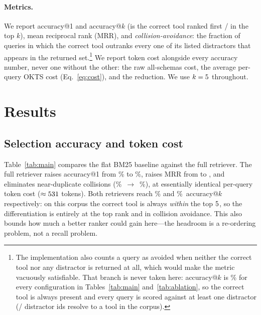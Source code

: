 \documentclass[11pt]{article}
\begin{document}
\paragraph{Metrics.} We report accuracy@1 and accuracy@$k$ (is the correct tool
ranked first / in the top $k$), mean reciprocal rank (MRR), and
\emph{collision-avoidance}: the fraction of queries in which the correct tool
outranks every one of its listed distractors that appears in the returned
set.\footnote{The implementation also counts a query as avoided when neither the
correct tool nor any distractor is returned at all, which would make the metric
vacuously satisfiable. That branch is never taken here: accuracy@$k$ is
\graphAccK\% for every configuration in Tables~\ref{tab:main}
and~\ref{tab:ablation}, so the correct tool is always present and every query is
scored against at least one distractor
(\numResolvableDistractors{}/\numDistractors{} distractor ids resolve to a tool
in the corpus).} We report token cost alongside every accuracy number, never one
without the other: the raw all-schemas cost, the average per-query OKTS cost
(Eq.~\ref{eq:cost}), and the reduction. We use $k=5$ throughout.

\section{Results}
\label{sec:results}

\subsection{Selection accuracy and token cost}

Table~\ref{tab:main} compares the flat BM25 baseline against the full retriever.
The full retriever raises accuracy@1 from \flatAccOne\% to \graphAccOne\%, raises
MRR from \flatMRR{} to \graphMRR{}, and eliminates near-duplicate collisions
(\flatColl\%~$\rightarrow$~\graphColl\%), at essentially identical per-query token
cost ($\approx531$ tokens). Both retrievers reach \flatAccK\%
and \graphAccK\%~accuracy@$k$ respectively: on this corpus the correct tool is
always \emph{within} the top $5$, so the differentiation is entirely at the
top rank and in collision avoidance. This also bounds how much a better ranker
could gain here---the headroom is a re-ordering problem, not a recall problem.
\end{document}
